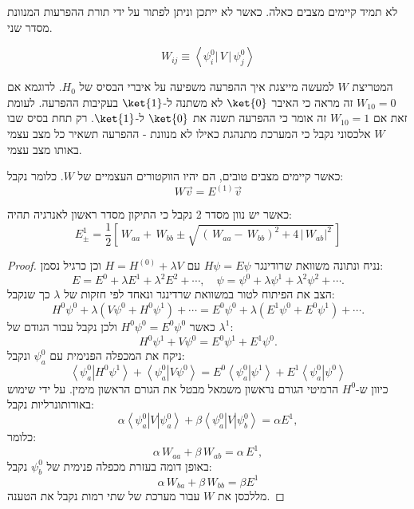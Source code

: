 \documentclass{tstextbook}
\begin{document}
\begin{remark}
לא תמיד קיימים מצבים כאלה. כאשר לא ייתכן וניתן לפתור על ידי תורת ההפרעות המנוונת מסדר שני.

\end{remark}
\begin{symbolize}
$$W_{i j}\equiv\left<\psi_{i}^{0}\left|\,V\,\right|\,\psi_{j}^{0}\right>$$

\end{symbolize}
\begin{remark}
המטריצת \(W\) למעשה מייצגת איך ההפרעה משפיעה על איברי הבסיס של \(H_{0}\). לדוגמא אם \(W_{10}=0\) זה מראה כי האיבר \(\ket{0}\) לא משתנה ל-\(\ket{1}\) בעקיבות ההפרעה. לעומת זאת אם \(W_{10}=1\) זה אומר כי ההפרעה תשנה את \(\ket{0}\) ל-\(\ket{1}\). רק תחת בסיס שבו \(W\) אלכסוני נקבל כי המערכת מתנהגת כאילו לא מנוונת - ההפרעה תשאיר כל מצב עצמי באותו מצב עצמי.

\end{remark}
\begin{proposition}
כאשר קיימים מצבים טובים, הם יהיו הווקטורים העצמיים של \(W\). כלומר נקבל:
$$W \vec{v}=E^{(1)}\vec{v}$$

\end{proposition}
\begin{proposition}
כאשר יש נוון מסדר 2 נקבל כי התיקון מסדר ראשון לאנרגיה תהיה:
$$E_{\pm}^{1}=\frac{1}{2}\left[\,W_{a a}+\,W_{b b}\pm\sqrt{\,(\,W_{a a}-\,W_{b b})^{2}+4\,|\,W_{a b}|^{2}\,}\right]$$

\end{proposition}
\begin{proof}
נניח ונתונה משוואת שרודינגר \(H\psi=E\psi\) עם \(H=H^{(0)}+\lambda V\) וכן כרגיל נסמן:
$$E=E^{0}+\lambda E^{1}+\lambda^{2}E^{2}+\cdots,\quad\psi=\psi^{0}+\lambda\psi^{1}+\lambda^{2}\psi^{2}+\cdots.$$
הצב את הפיתוח לטור במשוואת שרדינגר ונאחד לפי חזקות של \(\lambda\) כך שנקבל:
$$H^{0}\psi^{0}+\lambda\left(V\psi^{0}+H^{0}\psi^{1}\right)+\cdots=E^{0}\psi^{0}+\lambda\left(E^{1}\psi^{0}+E^{0}\psi^{1}\right)+\cdots.$$
כאשר \(H^{0}\psi^{0}=E^{0}\psi^{0}\) ולכן נקבל עבור הגודם של \(\lambda^{1}\):
$$H^{0}\psi^{1}+V\psi^{0}=E^{0}\psi^{1}+E^{1}\psi^{0}.$$
ניקח את המכפלה הפנימית עם \(\psi^{0}_{a}\) ונקבל:
$$\left\langle\psi_{a}^{0}\left|H^{0}\psi^{1}\right\rangle+\left\langle\psi_{a}^{0}\right|V\psi^{0}\right\rangle=E^{0}\left\langle\psi_{a}^{0}\left|\psi^{1}\right\rangle+E^{1}\left\langle\psi_{a}^{0}\right|\psi^{0}\right\rangle$$
כיוון ש-\(H^{0}\) הרמיטי הגורם נראשון משמאל מבטל את הגורם הראשון מימין. על ידי שימוש באורותונרליות נקבל:
$$\alpha\left\langle\psi_{a}^{0}\left|\right.V\left|\right.\psi_{a}^{0}\right\rangle+\beta\left\langle\psi_{a}^{0}\left|\right.V\left|\right.\psi_{b}^{0}\right\rangle=\alpha E^{1},$$
כלומר:
$$\alpha\,W_{a a}+\beta\,W_{a b}=\alpha\,E^{1},$$
באופן דומה בעזרת מכפלה פנימית של \(\psi_{b}^{0}\) נקבל:
$$\alpha\,W_{b a}+\beta\,W_{b b}=\beta E^{1}$$
מללכסן את \(W\) עבור מערכת של שתי רמות נקבל את הטענה.

\end{proof}
\end{document}
